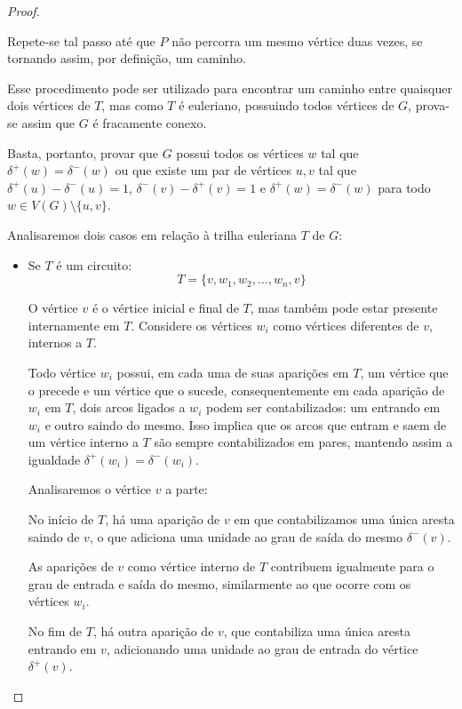 \begin{proof}
\begin{tcolorbox}
            Repete-se tal passo até que $P$ não percorra um mesmo vértice duas vezes, se tornando assim, por definição, um caminho.

        \end{tcolorbox}
    
    Esse procedimento pode ser utilizado para encontrar um caminho entre quaisquer dois vértices de $T$, mas como $T$ é euleriano, possuindo todos vértices de $G$, prova-se assim que $G$ é fracamente conexo. 

     Basta, portanto, provar que $G$ possui todos os vértices $w$ tal que $\delta^+(w) = \delta^-(w)$ ou que existe um par de vértices $u, v$ tal que $\delta^+(u) - \delta^-(u) = 1$, $\delta^-(v) - \delta^+(v) = 1$ e $\delta^+(w) = \delta^-(w)$ para todo $w \in V(G)\setminus \{u, v\}$.

    Analisaremos dois casos em relação à trilha euleriana $T$ de $G$:

    \begin{itemize}
        \item Se $T$ é um circuito:
            \[
                T  = \{v, w_1, w_2, \dots, w_n, v\}
            \]

            O vértice $v$ é o vértice inicial e final de $T$, mas também pode estar presente internamente em $T$. 
            Considere os vértices $w_i$ como vértices diferentes de $v$, internos a $T$.

            Todo vértice $w_i$ possui, em cada uma de suas aparições em $T$, um vértice que o precede e um vértice que o sucede, consequentemente em cada aparição de $w_i$ em $T$, dois arcos ligados a $w_i$ podem ser contabilizados: um entrando em $w_i$ e outro saindo do mesmo. 
            Isso implica que os arcos que entram e saem de um vértice interno a $T$ são sempre contabilizados em pares, mantendo assim a igualdade $\delta^+(w_i) = \delta^-(w_i)$.

            Analisaremos o vértice $v$ a parte:

            No início de $T$, há uma aparição de $v$ em que contabilizamos uma única aresta saindo de $v$, o que adiciona uma unidade ao grau de saída do mesmo $\delta^-(v)$.

            As aparições de $v$ como vértice interno de $T$ contribuem igualmente para o grau de entrada e saída do mesmo, similarmente ao que ocorre com os vértices $w_i$.

            No fim de $T$, há outra aparição de $v$, que contabiliza uma única aresta entrando em $v$, adicionando uma unidade ao grau de entrada do vértice $\delta^+(v)$.


\end{itemize}
\end{proof}
